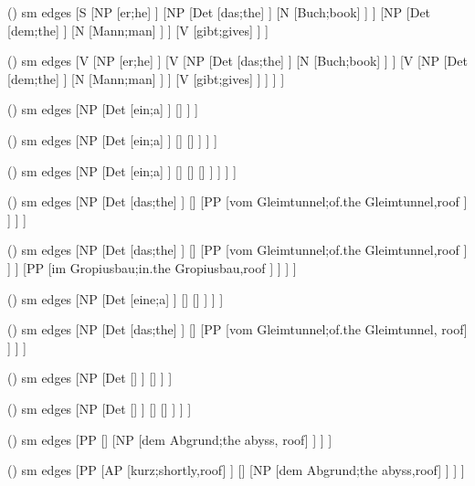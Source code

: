 \begin {forest}()
 sm edges [S [NP [er;he] ] [NP [Det [das;the] ] [N [Buch;book] ] ] [NP [Det [dem;the] ] [N [Mann;man] ] ] [V [gibt;gives] ] ] \end {forest}
\begin {forest}()
 sm edges [V [NP [er;he] ] [V [NP [Det [das;the] ] [N [Buch;book] ] ] [V [NP [Det [dem;the] ] [N [Mann;man] ] ] [V [gibt;gives] ] ] ] ] \end {forest}
\begin {forest}()
 sm edges [NP [Det [ein;a] ] [\nbar [N [Eichhörnchen;squirrel] ] ] ] \end {forest}
\begin {forest}()
 sm edges [NP [Det [ein;a] ] [\nbar [A [graues;grey] ] [\nbar [N [Eichhörnchen;squirrel] ] ] ] ] \end {forest}
\begin {forest}()
 sm edges [NP [Det [ein;a] ] [\nbar [A [großes;big] ] [\nbar [A [graues;grey] ] [\nbar [N [Eichhörnchen;squirrel] ] ] ] ] ] \end {forest}
\begin {forest}()
 sm edges [NP [Det [das;the] ] [\nbar [N [Bild;picture] ] [PP [vom Gleimtunnel;of.the Gleimtunnel,roof ] ] ] ] \end {forest}
\begin {forest}()
 sm edges [NP [Det [das;the] ] [\nbar [\nbar [N [Bild;picture] ] [PP [vom Gleimtunnel;of.the Gleimtunnel,roof ] ] ] [PP [im Gropiusbau;in.the Gropiusbau,roof ] ] ] ] \end {forest}
\begin {forest}()
 sm edges [NP [Det [eine;a] ] [\nbar [A [kluge;smart] ] [\nbar [N [\trace ] ] ] ] ] \end {forest}
\begin {forest}()
 sm edges [NP [Det [das;the] ] [\nbar [N [\trace ] ] [PP [vom Gleimtunnel;of.the Gleimtunnel, roof] ] ] ] \end {forest}
\begin {forest}()
 sm edges [NP [Det [\trace ] ] [\nbar [N [Frauen;women] ] ] ] \end {forest}
\begin {forest}()
 sm edges [NP [Det [\trace ] ] [\nbar [A [klugen;smart] ] [\nbar [N [\trace ] ] ] ] ] \end {forest}
\begin {forest}()
 sm edges [PP [\pbar [P [vor;before] ] [NP [dem Abgrund;the abyss, roof] ] ] ] \end {forest}
\begin {forest}()
 sm edges [PP [AP [kurz;shortly,roof] ] [\pbar [P [vor;before] ] [NP [dem Abgrund;the abyss,roof] ] ] ] \end {forest}
